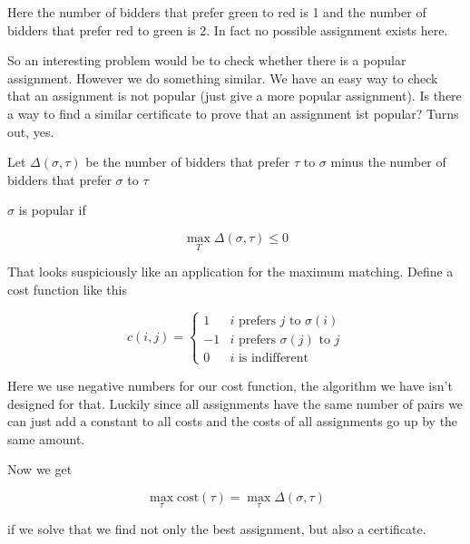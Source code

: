 Here the number of bidders that prefer green to red is 1 and the number of bidders that prefer red to green is 2. In fact no possible assignment exists here.

So an interesting problem would be to check whether there is a popular assignment. However we do something similar. We have an easy way to check that an assignment is not popular (just give a more popular assignment). Is there a way to find a similar certificate to prove that an assignment ist popular? Turns out, yes.

\begin{Def} Let $\Delta(\sigma,\tau)$ be the number of bidders that prefer $\tau$ to $\sigma$ minus the number of bidders that prefer $\sigma$ to $\tau$

$\sigma$ is popular if 

\[\max _T \Delta (\sigma, \tau) \leq 0\]
\end{Def}

That looks suspiciously like an application for the maximum matching. Define a cost function like this

\[c(i,j) = \begin{cases}
1 & i \text{ prefers } j \text{ to } \sigma(i)\\
-1 & i \text{ prefers } \sigma(j) \text{ to } j\\
0 & i \text{ is indifferent}
\end{cases}\]

Here we use negative numbers for our cost function, the algorithm we have isn't designed for that. Luckily since all assignments have the same number of pairs we can just add a constant to all costs and the costs of all assignments go up by the same amount.

Now we get

\[\max_\tau \text{cost}(\tau) = \max_\tau \Delta(\sigma,\tau)\]

if we solve that we find not only the best assignment, but also a certificate. %

